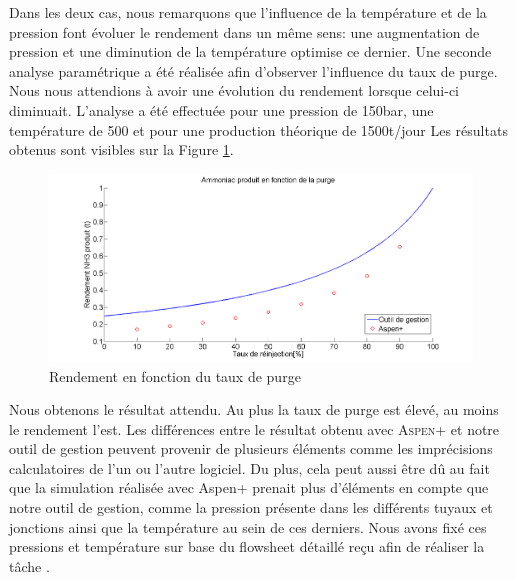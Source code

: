 Dans les deux cas, nous remarquons que l'influence de la température et de la pression font évoluer le rendement dans un même sens: une augmentation de pression et une diminution de la température optimise ce dernier.
Une seconde analyse paramétrique a été réalisée afin d'observer l'influence du taux de purge. Nous nous attendions à avoir une évolution du rendement lorsque celui-ci diminuait. L'analyse a été effectuée pour une pression de \unit{150}{bar}, une température de \unit{500}{\celsius} et pour une production théorique de \unit{1500}{t/jour} Les résultats obtenus sont visibles sur la Figure \ref{schemee}.
\begin{figure}[ht!]
\centering
\includegraphics[scale=0.35]{GrapheCompPu.png}
\caption{Rendement en fonction du taux de purge}
\label{schemee}
\end{figure}
Nous obtenons le résultat attendu. Au plus la taux de purge est élevé, au moins le rendement l'est.
Les différences entre le résultat obtenu avec \textsc{Aspen+} et notre outil de gestion peuvent provenir de plusieurs éléments comme les imprécisions calculatoires de l'un ou l'autre logiciel. Du plus, cela peut aussi être dû au fait que la simulation réalisée avec Aspen+ prenait plus d'éléments en compte que notre outil de gestion, comme la pression présente dans les différents tuyaux et jonctions ainsi que la température au sein de ces derniers. Nous avons fixé ces pressions et température sur base du flowsheet détaillé reçu afin de réaliser la tâche .
